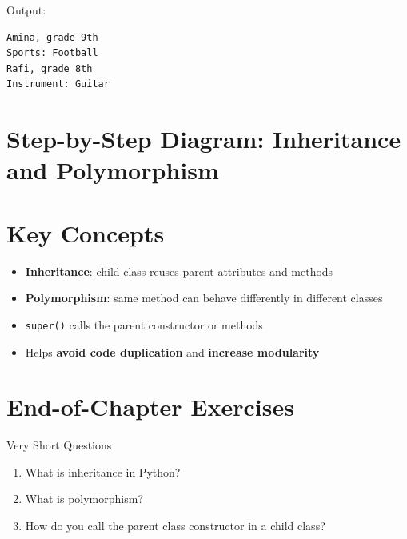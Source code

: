 Output:

\begin{verbatim}
Amina, grade 9th
Sports: Football
Rafi, grade 8th
Instrument: Guitar
\end{verbatim}

\section{Step-by-Step Diagram: Inheritance and Polymorphism}

\begin{center}
\end{center}

\section{Key Concepts}

\begin{itemize}
    \item \textbf{Inheritance}: child class reuses parent attributes and methods  
    \item \textbf{Polymorphism}: same method can behave differently in different classes  
    \item \texttt{super()} calls the parent constructor or methods  
    \item Helps \textbf{avoid code duplication} and \textbf{increase modularity}  
\end{itemize}

\section{End-of-Chapter Exercises}

\begin{exercise}{Very Short Questions}
\begin{enumerate}
    \item What is inheritance in Python?  
    \item What is polymorphism?  
    \item How do you call the parent class constructor in a child class?  
\end{enumerate}
\end{exercise}

